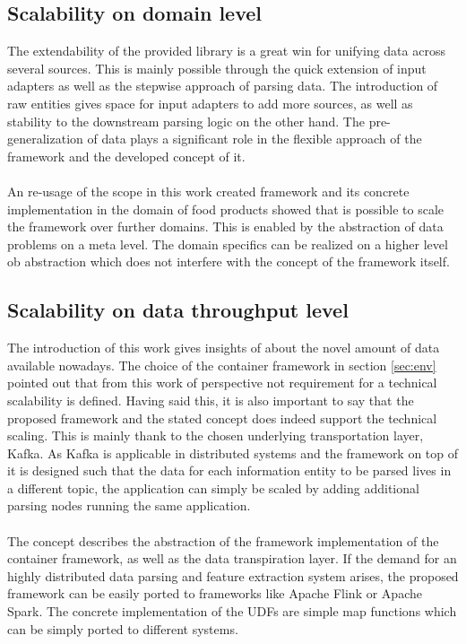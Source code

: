 \subsection{Scalability on domain level}

The extendability of the provided library is a great win for unifying data across several sources. This is mainly possible through the quick extension of input adapters as well as the stepwise approach of parsing data. The introduction of raw entities gives space for input adapters to add more sources, as well as stability to the downstream parsing logic on the other hand. The pre-generalization of data plays a significant role in the flexible approach of the framework and the developed concept of it.
\\\\
An re-usage of the scope in this work created framework and its concrete implementation in the domain of food products showed that is possible to scale the framework over further domains. This is enabled by the abstraction of data problems on a meta level. The domain specifics can be realized on a higher level ob abstraction which does not interfere with the concept of the framework itself.

\subsection{Scalability on data throughput level}

The introduction of this work gives insights of about the novel amount of data available nowadays. The choice of the container framework in section \ref{sec:env} pointed out that from this work of perspective not requirement for a technical scalability is defined. Having said this, it is also important to say that the proposed framework and the stated concept does indeed support the technical scaling. This is mainly thank to the chosen underlying transportation layer, Kafka. As Kafka is applicable in distributed systems and the framework on top of it is designed such that the data for each information entity to be parsed lives in a different topic, the application can simply be scaled by adding additional parsing nodes running the same application.
\\\\
The concept describes the abstraction of the framework implementation of the container framework, as well as the data transpiration layer. If the demand for an highly distributed data parsing and feature extraction system arises, the proposed framework can be easily ported to frameworks like Apache Flink or Apache Spark. The concrete implementation of the UDFs are simple map functions which can be simply ported to different systems.















